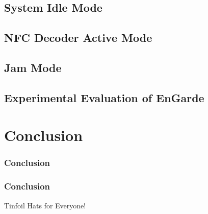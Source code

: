 \documentclass[unknownkeysallowed]{beamer}
\begin{document}
\subsection{System Idle Mode}
\subsection{NFC Decoder Active Mode}
\subsection{Jam Mode}
\subsection{Experimental Evaluation of EnGarde}


\section{Conclusion}
\begin{frame}
\frametitle{Conclusion}
\begin{center}\begin{minipage}{.9\textwidth}
\tableofcontents[currentsubsection, hideothersubsections, sectionstyle=show/shaded]
\end{minipage}\end{center}
\end{frame}
%
\begin{frame}
  \frametitle{Conclusion}
  \begin{block}{Tinfoil Hats for Everyone!}
  \end{block}
\end{frame}
\end{document}
